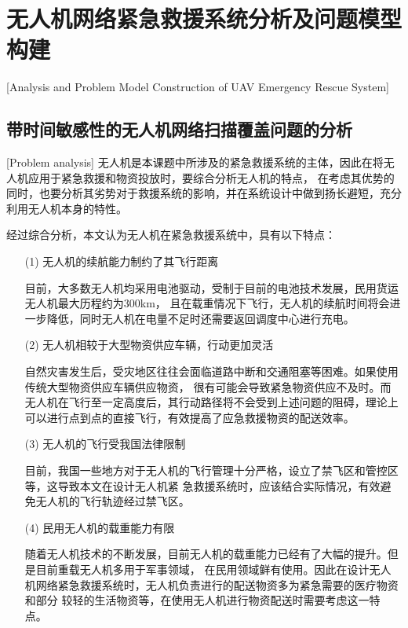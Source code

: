 
\chapter{无人机网络紧急救援系统分析及问题模型构建}[Analysis and Problem Model Construction of UAV Emergency Rescue System]

\section{带时间敏感性的无人机网络扫描覆盖问题的分析}[Problem analysis]
无人机是本课题中所涉及的紧急救援系统的主体，因此在将无人机应用于紧急救援和物资投放时，要综合分析无人机的特点，
在考虑其优势的同时，也要分析其劣势对于救援系统的影响，并在系统设计中做到扬长避短，充分利用无人机本身的特性。


经过综合分析，本文认为无人机在紧急救援系统中，具有以下特点：
\begin{itemize}
	\item [(1)] 
	无人机的续航能力制约了其飞行距离


	\qquad 目前，大多数无人机均采用电池驱动，受制于目前的电池技术发展，民用货运无人机最大历程约为300km，
	且在载重情况下飞行，无人机的续航时间将会进一步降低，同时无人机在电量不足时还需要返回调度中心进行充电\cite{jin2017}。
	\item [(2)]
	无人机相较于大型物资供应车辆，行动更加灵活


	\qquad 自然灾害发生后，受灾地区往往会面临道路中断和交通阻塞等困难。如果使用传统大型物资供应车辆供应物资，
	很有可能会导致紧急物资供应不及时。而无人机在飞行至一定高度后，其行动路径将不会受到上述问题的阻碍，理论上
	可以进行点到点的直接飞行，有效提高了应急救援物资的配送效率\cite{chenhao2019}。
	\item [(3)]
	无人机的飞行受我国法律限制


	\qquad 目前，我国一些地方对于无人机的飞行管理十分严格，设立了禁飞区和管控区等\cite{shu2020}，这导致本文在设计无人机紧
	急救援系统时，应该结合实际情况，有效避免无人机的飞行轨迹经过禁飞区。
	\item [(4)]
	民用无人机的载重能力有限


	\qquad 随着无人机技术的不断发展，目前无人机的载重能力已经有了大幅的提升。但是目前重载无人机多用于军事领域，
	在民用领域鲜有使用。因此在设计无人机网络紧急救援系统时，无人机负责进行的配送物资多为紧急需要的医疗物资和部分
	较轻的生活物资等，在使用无人机进行物资配送时需要考虑这一特点\cite{liuping2016}。
\end{itemize}

